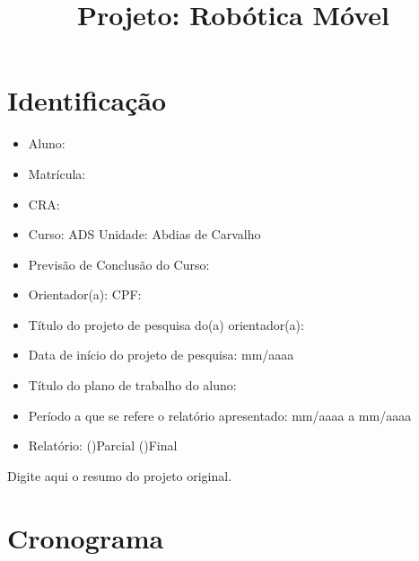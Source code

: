 \documentclass[12pt]{article}
\title{Projeto: Robótica Móvel}
\begin{document}
 

\maketitle

\section*{Identificação}
\begin{itemize}
    \item Aluno:
    \item Matrícula:
    \item CRA:
    \item Curso:    ADS    \hspace{0.5cm}Unidade: Abdias de Carvalho
    \item Previsão de Conclusão do Curso:
    \item Orientador(a): \hspace{0.5cm}CPF:
    \item Título do projeto de pesquisa do(a) orientador(a):
    \item Data de início do projeto de pesquisa: mm/aaaa
    \item Título do plano de trabalho do aluno:
    \item Período a que se refere o relatório apresentado: mm/aaaa a mm/aaaa
    \item Relatório: (\hspace{0.5cm})Parcial \hspace{1cm} (\hspace{0.5cm})Final
    
\end{itemize}

\begin{resumo} %
Digite aqui o resumo do projeto original.
\end{resumo}




\section{Cronograma}
\end{document}

